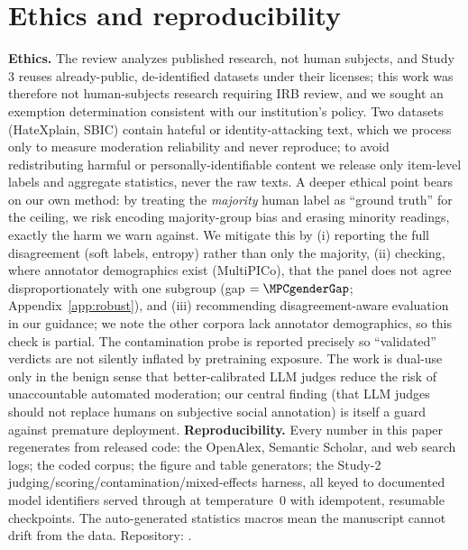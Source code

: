 \section{Ethics and reproducibility}
\textbf{Ethics.} The review analyzes published research, not human subjects, and Study 3 reuses already-public,
de-identified datasets under their licenses; this work was therefore not human-subjects research requiring IRB
review, and we sought an exemption determination consistent with our institution's policy. Two datasets (HateXplain,
SBIC) contain hateful or identity-attacking text, which we process only to measure moderation reliability and never
reproduce; to avoid redistributing harmful or personally-identifiable content we release only item-level labels and
aggregate statistics, never the raw texts. A deeper ethical point bears on our own method: by treating the
\emph{majority} human label as ``ground truth'' for the ceiling, we risk encoding majority-group bias and erasing
minority readings, exactly the harm we warn against. We mitigate this by (i) reporting the full disagreement (soft
labels, entropy) rather than only the majority, (ii) checking, where annotator demographics exist (MultiPICo), that
the panel does not agree disproportionately with one subgroup (gap $=\MPCgenderGap$; Appendix~\ref{app:robust}), and
(iii) recommending disagreement-aware evaluation in our guidance; we note the other corpora lack annotator
demographics, so this check is partial. The contamination probe is reported precisely so ``validated'' verdicts are
not silently inflated by pretraining exposure. The work is dual-use only in the benign sense that better-calibrated
LLM judges reduce the risk of unaccountable automated moderation; our central finding (that LLM judges should not replace humans on subjective social annotation) is itself a guard against premature deployment.
\textbf{Reproducibility.} Every number in this paper regenerates from released code: the OpenAlex, Semantic Scholar,
and web search logs; the coded corpus; the figure and table generators; the Study-2 judging/scoring/contamination/mixed-effects harness, all keyed to documented model identifiers served through
\PROVIDER{} at temperature~$0$ with idempotent, resumable checkpoints. The auto-generated statistics macros
mean the manuscript cannot drift from the data. Repository: \REPO{}.

